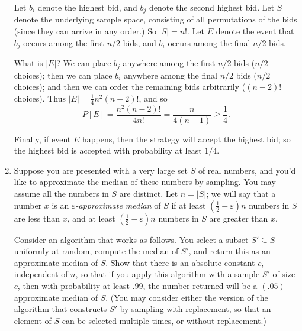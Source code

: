 \documentclass[12pt]{article}
\def\ve{{\varepsilon}}
\begin{document}
\begin{enumerate}
{Let $b_i$ denote the highest bid, and $b_j$ denote
the second highest bid.
Let $S$ denote the underlying sample space,
consisting of all permutations of the bids
(since they can arrive in any order.)
So $|S| = n!$.
Let $E$ denote the event that $b_j$ occurs among
the first $n/2$ bids, and $b_i$ occurs among
the final $n/2$ bids.

What is $|E|$?
We can place $b_j$ anywhere among the first $n/2$ bids
($n/2$ choices);
then we can place $b_i$ anywhere among the final $n/2$ bids
($n/2$ choices);
and then we can order the remaining bids arbitrarily
($(n-2)!$ choices).
Thus $|E| = \frac14 n^2 (n-2)!$, and so
$$P[E] = \frac{n^2 (n-2)!}{4 n!} = \frac{n}{4(n-1)} \geq \frac14.$$

Finally, if event $E$ happens, then the strategy will
accept the highest bid; so the highest bid is accepted
with probability at least $1/4$.

}



\item 

Suppose you are presented with a very large set $S$ of real numbers,
and you'd like to approximate the median of these numbers by sampling.
You may assume all the numbers in $S$ are distinct.
Let $n = |S|$; we will say that a number $x$ is an
{\em $\ve$-approximate median} of $S$ if at least
$(\frac12 - \ve) n$ numbers in $S$ are less than $x$,
and at least $(\frac12 - \ve) n$ numbers in $S$ are
greater than $x$.

Consider an algorithm that works as follows.
You select a subset $S' \subseteq S$ uniformly at random,
compute the median of $S'$, and return this as an
approximate median of $S$.
Show that there is an absolute constant $c$, independent of $n$,
so that if you apply this algorithm with a sample $S'$ of size $c$,
then with probability at least $.99$,
the number returned will be a $(.05)$-approximate median of $S$.
(You may consider either the version of the algorithm
that constructs $S'$ by sampling with replacement, so that
an element of $S$ can be selected multiple times,
or without replacement.)



\end{enumerate}
\end{document}
